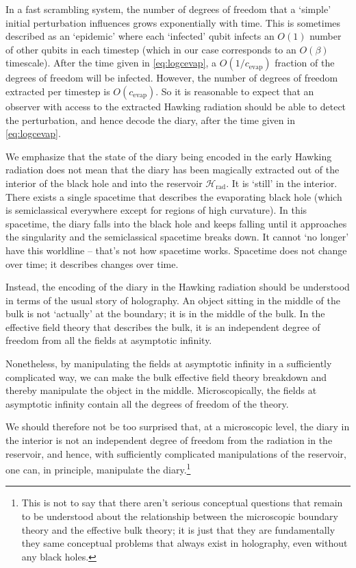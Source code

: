 \documentclass[11pt,a4paper]{article}
\begin{document}
In a fast scrambling system, the number of degrees of freedom that a `simple' initial perturbation influences grows exponentially with time. This is sometimes described as an `epidemic' where each `infected' qubit infects an $O(1)$ number of other qubits in each timestep (which in our case corresponds to an $O(\beta)$ timescale). After the time given in \eqref{eq:logcevap}, a $O(1/c_\text{evap})$ fraction of the degrees of freedom will be infected. However, the number of degrees of freedom extracted per timestep is $O(c_\text{evap})$. So it is reasonable to expect that an observer with access to the extracted Hawking radiation should be able to detect the perturbation, and hence decode the diary, after the time given in \eqref{eq:logcevap}.

We emphasize that the state of the diary being encoded in the early Hawking radiation does not mean that the diary has been magically extracted out of the interior of the black hole and into the reservoir $\mathcal{H}_\text{rad}$. It is `still' in the interior. There exists a single spacetime that describes the evaporating black hole (which is semiclassical everywhere except for regions of high curvature). In this spacetime, the diary falls into the black hole and keeps falling until it approaches the singularity and the semiclassical spacetime breaks down. It cannot `no longer' have this worldline -- that's not how spacetime works. Spacetime does not change over time; it describes changes over time.

Instead, the encoding of the diary in the Hawking radiation should be understood in terms of the usual story of holography. An object sitting in the middle of the bulk is not `actually' at the boundary; it is in the middle of the bulk. In the effective field theory that describes the bulk, it is an independent degree of freedom from all the fields at asymptotic infinity. 

Nonetheless, by manipulating the fields at asymptotic infinity in a sufficiently complicated way, we can make the bulk effective field theory breakdown and thereby manipulate the object in the middle. Microscopically, the fields at asymptotic infinity contain all the degrees of freedom of the theory. 

We should therefore not be too surprised that, at a microscopic level, the diary in the interior is not an independent degree of freedom from the radiation in the reservoir, and hence, with sufficiently complicated manipulations of the reservoir, one can, in principle, manipulate the diary.\footnote{This is not to say that there aren't serious conceptual questions that remain to be understood about the relationship between the microscopic boundary theory and the effective bulk theory; it is just that they are fundamentally they same conceptual problems that always exist in holography, even without any black holes.}
\end{document}
